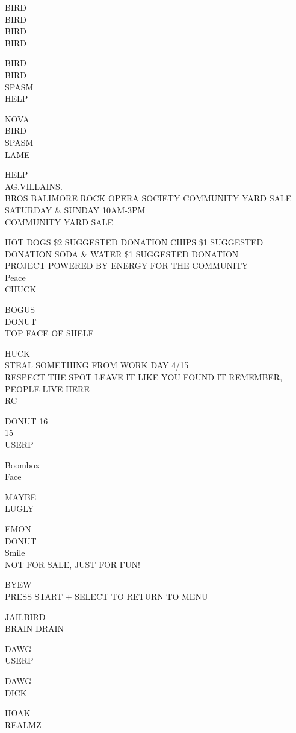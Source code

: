 \documentclass[10pt,letterpaper]{article}
\begin{document}
BIRD\\
BIRD\\
BIRD\\
BIRD

BIRD\\
BIRD\\
SPASM\\
HELP

NOVA\\
BIRD\\
SPASM\\
LAME

HELP\\
AG.VILLAINS.\\
BROS BALIMORE ROCK OPERA SOCIETY COMMUNITY YARD SALE SATURDAY \& SUNDAY 10AM{-}3PM\\
COMMUNITY YARD SALE

HOT DOGS \$2 SUGGESTED DONATION CHIPS \$1 SUGGESTED DONATION SODA \& WATER \$1 SUGGESTED DONATION\\
PROJECT POWERED BY ENERGY FOR THE COMMUNITY\\
Peace\\
CHUCK

BOGUS\\
DONUT\\
TOP FACE OF SHELF

HUCK\\
STEAL SOMETHING FROM WORK DAY 4/15\\
RESPECT THE SPOT LEAVE IT LIKE YOU FOUND IT REMEMBER, PEOPLE LIVE HERE\\
RC

DONUT 16\\
15\\
USERP

Boombox\\
Face

MAYBE\\
LUGLY

EMON\\
DONUT\\
Smile\\
NOT FOR SALE, JUST FOR FUN!

BYEW\\
PRESS START + SELECT TO RETURN TO MENU

JAILBIRD\\
BRAIN DRAIN

DAWG\\
USERP

DAWG\\
DICK

HOAK\\
REALMZ
\end{document}

